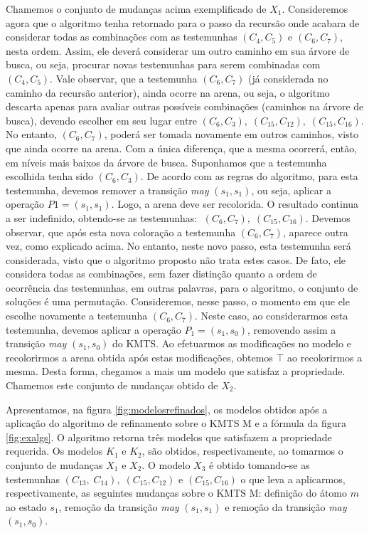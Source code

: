 \documentclass[normaltoc,capchap,capsec,times]{abnt}
\begin{document}
Chamemos o conjunto de mudanças acima exemplificado de $X_1$. Consideremos agora que o algoritmo tenha retornado para o passo da recursão onde acabara de considerar todas as combinações com as testemunhas $(C_4,C_5)$ e $(C_6,C_7)$, nesta ordem. Assim, ele deverá considerar um outro caminho em sua árvore de busca, ou seja, procurar novas testemunhas para serem combinadas com $(C_4,C_5)$. Vale observar,  que a testemunha $(C_6,C_7)$ (já considerada no caminho da recursão anterior), ainda ocorre na arena, ou seja, o algoritmo descarta apenas para avaliar outras possíveis combinações (caminhos na árvore de busca), devendo escolher em seu lugar entre $(C_6,C_3), \; (C_{15},C_{12}), \; (C_{15},C_{16})$. No entanto, $(C_6,C_7)$, poderá ser tomada novamente em outros caminhos, visto que ainda ocorre na arena. Com a única diferença, que a mesma ocorrerá, então, em níveis mais baixos da árvore de busca. Suponhamos que a testemunha escolhida tenha sido $(C_6,C_3)$. De acordo com as regras do algoritmo, para esta testemunha, devemos remover a transição \textit{may} $(s_1,s_1)$, ou seja, aplicar a operação $P1=(s_1,s_1)$. Logo, a arena deve ser recolorida. O resultado continua a ser indefinido, obtendo-se as testemunhas: $ \; (C_6,C_7), \; (C_{15}, C_{16}) $. Devemos observar, que após esta nova coloração a testemunha $(C_6,C_7)$, aparece outra vez, como explicado acima. No entanto, neste novo passo, esta testemunha será considerada, visto que o algoritmo proposto não trata estes casos. De fato, ele considera todas as combinações, sem fazer distinção quanto a ordem de ocorrência das testemunhas, em outras palavras, para o algoritmo, o conjunto de soluções é uma permutação. Consideremos, nesse passo, o momento em que ele escolhe novamente a testemunha $(C_6,C_7)$. %
Neste caso, ao considerarmos esta testemunha, devemos aplicar a operação $P_1=(s_1,s_0)$, removendo assim a transição \textit{may} $(s_1,s_0)$ do KMTS. Ao efetuarmos as modificações no modelo e recolorirmos a arena obtida após estas modificações,  obtemos $\top$ ao recolorirmos a mesma. Desta forma, chegamos a mais um modelo que satisfaz a propriedade. Chamemos este conjunto de mudanças obtido de $X_2$. 

Apresentamos, na figura \ref{fig:modelosrefinados}, os modelos obtidos após a aplicação do algoritmo de refinamento sobre o KMTS M e a fórmula da figura \ref{fig:exalgs}. O algoritmo retorna três modelos que satisfazem a propriedade requerida. Os modelos $K_1$ e $K_2$, são obtidos, respectivamente, ao tomarmos o conjunto de mudanças $X_1$ e $X_2$. O modelo $X_3$ é obtido tomando-se as testemunhas $(C_{13}, \;C_{14}), \;(C_{15},C_{12})$ e $(C_{15},C_{16})$ o que leva a aplicarmos, respectivamente, as seguintes mudanças sobre o KMTS M: definição do átomo $m$ ao estado $s_1$, remoção da transição \textit{may} $(s_1,s_1)$ e remoção da transição \textit{may} $(s_1,s_0)$. 
\end{document}
